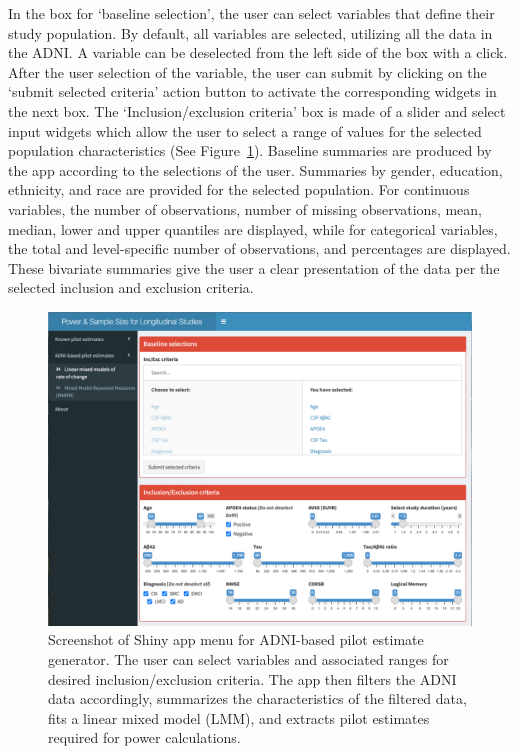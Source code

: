 In the box for `baseline selection', the user can select variables that define their study population. By default, all variables are selected, utilizing all the data in the ADNI. A variable can be deselected from the left side of the box with a click. After the user selection of the variable, the user can submit by clicking on the `submit selected criteria' action button to activate the corresponding widgets in the next box. The `Inclusion/exclusion criteria' box is made of a slider and select input widgets which allow the user to select a range of values for the selected population characteristics (See Figure~\ref{ADNIbase}). Baseline summaries are produced by the app according to the selections of the user. Summaries by gender, education, ethnicity, and race are provided for the selected population. For continuous variables, the number of observations, number of missing observations, mean, median, lower and upper quantiles are displayed, while for categorical variables, the total and level-specific number of observations, and percentages are displayed. These bivariate summaries give the user a clear presentation of the data per the selected inclusion and exclusion criteria. 

\begin{figure}[ht]
	\includegraphics[width=14cm]{Figures/ADNI-inputs.pdf}
	\caption{Screenshot of Shiny app menu for ADNI-based pilot estimate generator. The user can select variables and associated ranges for desired inclusion/exclusion criteria. The app then filters the ADNI data accordingly, summarizes the characteristics of the filtered data, fits a linear mixed model (LMM), and extracts pilot estimates required for power calculations.}\label{ADNIbase}
\end{figure}

